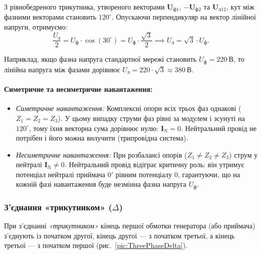 З рівнобедреного трикутника, утвореного векторами $\mathbf{U}_{\text{ф}1}$, $-\mathbf{U}_{\text{ф}2}$ та $\mathbf{U}_{\text{л}12}$, кут між фазними векторами становить $120^\circ$. Опускаючи перпендикуляр на вектор лінійної напруги, отримуємо:
\begin{equation}
	\frac{U_\text{л}}{2} = U_\text{ф} \cdot \cos(30^\circ) = U_\text{ф} \cdot \frac{\sqrt{3}}{2} \implies U_\text{л} = \sqrt{3} \cdot U_\text{ф}.
\end{equation}

Наприклад, якщо фазна напруга стандартної мережі становить $U_\text{ф} = 220~\text{В}$, то лінійна напруга між фазами дорівнює $U_\text{л} = 220 \cdot \sqrt{3} \approx 380~\text{В}$.

\paragraph{Симетричне та несиметричне навантаження:}
\begin{itemize}
    \item \emph{Симетричне навантаження:} Комплексні опори всіх трьох фаз однакові ($Z_1 = Z_2 = Z_3$). У цьому випадку струми фаз рівні за модулем і зсунуті на $120^\circ$, тому їхня векторна сума дорівнює нулю: $\mathbf{I}_\text{N} = 0$. Нейтральний провід не потрібен і його можна вилучити (трипровідна система).
    \item \emph{Несиметричне навантаження:} При розбалансі опорів ($Z_1 \neq Z_2 \neq Z_3$) струм у нейтралі $\mathbf{I}_\text{N} \neq 0$. Нейтральний провід відіграє критичну роль: він утримує потенціал нейтралі приймача $0'$ рівним потенціалу $0$, гарантуючи, що на кожній фазі навантаження буде незмінна фазна напруга $U_\text{ф}$.
\end{itemize}

\subsubsection{З'єднання «трикутником» ($\Delta$)}

При з'єднанні \emph{«трикутником»} кінець першої обмотки генератора (або приймача) з'єднують із початком другої, кінець другої --- з початком третьої, а кінець третьої --- з початком першої (рис.~\ref{pic:ThreePhaseDelta}).

